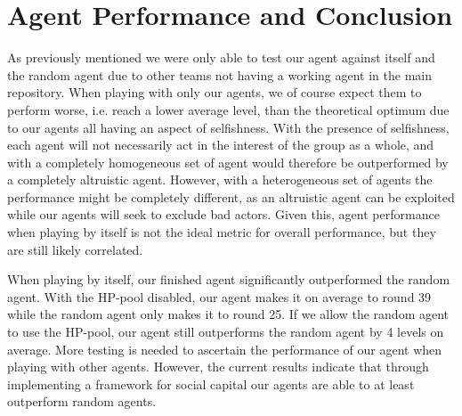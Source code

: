 
\section{Agent Performance and Conclusion}

As previously mentioned we were only able to test our agent against itself and the random agent due to other teams not having a working agent in the main repository. When playing with only our agents, we of course expect them to perform worse, i.e. reach a lower average level, than the theoretical optimum due to our agents all having an aspect of selfishness. With the presence of selfishness, each agent will not necessarily act in the interest of the group as a whole, and with a completely homogeneous set of agent would therefore be outperformed by a completely altruistic agent. However, with a heterogeneous set of agents the performance might be completely different, as an altruistic agent can be exploited while our agents will seek to exclude bad actors. Given this, agent performance when playing by itself is not the ideal metric for overall performance, but they are still likely correlated.

When playing by itself, our finished agent significantly outperformed the random agent. With the HP-pool disabled, our agent makes it on average to round 39 while the random agent only makes it to round 25. If we allow the random agent to use the HP-pool, our agent still outperforms the random agent by 4 levels on average. More testing is needed to ascertain the performance of our agent when playing with other agents. However, the current results indicate that through implementing a framework for social capital our agents are able to at least outperform random agents. 
